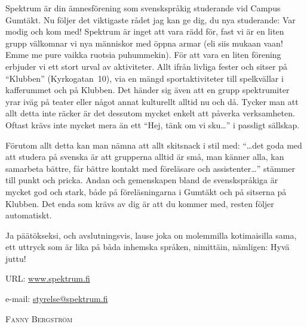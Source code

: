 \documentclass[a5paper, 8pt, twocolumn]{book} %
\numberwithin{equation}{section}
\begin{document}
Spektrum är din ämnesförening som
svenskspråkig studerande vid Campus
Gumtäkt. Nu följer det viktigaste rådet jag
kan ge dig, du nya studerande: Var modig
och kom med! Spektrum är inget att vara
rädd för, fast vi är en liten grupp välkomnar
vi nya människor med öppna armar (eli
siis mukaan vaan! Emme me pure vaikka
ruotsia puhummekin). För att vara en liten
förening erbjuder vi ett stort urval av aktiviteter.
Allt ifrån livliga fester och sitser på
``Klubben'' (Kyrkogatan~10), via en mängd
sportaktiviteter till spelkvällar i kafferummet
och på Klubben. Det händer sig även
att en grupp spektrumiter yrar iväg på teater
eller något annat kulturellt alltid nu och
då. Tycker man att allt detta inte räcker är
det dessutom mycket enkelt att påverka
verksamheten. Oftast krävs inte mycket
mera än ett ``Hej, tänk om vi sku\dots'' i passligt
sällskap.

Förutom allt detta kan man nämna att
allt skitsnack i stil med: ``\dots det goda med
att studera på svenska är att grupperna alltid
är små, man känner alla, kan samarbeta
bättre, får bättre kontakt med föreläsare
och assistenter\dots'' stämmer till punkt och
pricka. Andan och gemenskapen bland de
svenskspråkiga är mycket god och stark,
både på föreläsningarna i Gumtäkt och på
sitserna på Klubben. Det enda som krävs
av dig är att du kommer med, resten följer
automatiskt.

Ja päätökseksi, och avslutningsvis, lause
joka on molemmilla kotimaisilla sama,
ett uttryck som är lika på båda inhemska
språken, nimittäin, nämligen: Hyvä juttu!

\noindent URL: \url{www.spektrum.fi}

\noindent e-mail: \url{styrelse@spektrum.fi}

\vspace{0.5cm}\noindent\textsc{Fanny Bergström}
\end{document}
